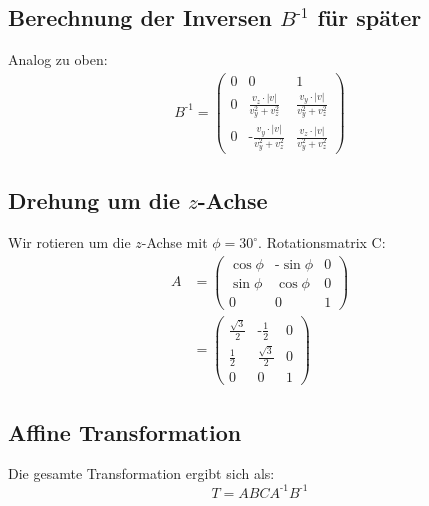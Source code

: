 \documentclass[a4paper]{scrartcl}
\begin{document}
\subsection*{Berechnung der Inversen $B^{\text{-}1}$ für später}
Analog zu oben:
\begin{align*}
B^{\text{-}1} = 
\begin{pmatrix}
0 & 0 & 1 \\
0 & \frac{v_z \cdot \left|v\right|}{v_y^2 + v_z^2} & \frac{v_y \cdot \left|v\right|}{v_y^2 + v_z^2}\\
0 & \text{-}\frac{v_y \cdot \left|v\right|}{v_y^2 + v_z^2} & \frac{v_z \cdot \left|v\right|}{v_y^2 + v_z^2}
\end{pmatrix}
\end{align*}

\subsection*{Drehung um die $z$-Achse}
Wir rotieren um die $z$-Achse mit $\phi = 30^\circ$. Rotationsmatrix C:
\begin{align*}
A & = \begin{pmatrix} \cos\phi & \text{-}\sin\phi & 0 \\ \sin\phi & \cos\phi & 0 \\ 0 & 0 & 1 \end{pmatrix}
\\
& = \begin{pmatrix} \frac{\sqrt{3}}{2} & \text{-}\frac{1}{2} & 0 \\ \frac{1}{2} & \frac{\sqrt{3}}{2} & 0 \\ 0 & 0 & 1\end{pmatrix}
\end{align*}

\subsection*{Affine Transformation}
Die gesamte Transformation ergibt sich als:
\begin{equation*}
T = ABCA^{\text{-}1}B^{\text{-}1}
\end{equation*}
\end{document}
